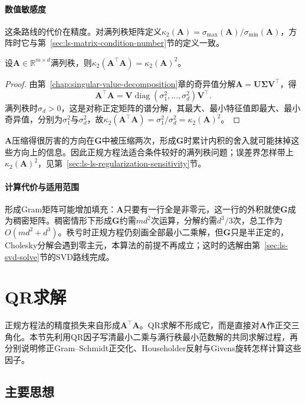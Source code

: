 \paragraph{数值敏感度}
这条路线的代价在精度。对满列秩矩阵定义$\kappa_2(\bm A)=\sigma_{\max}(\bm A)/\sigma_{\min}(\bm A)$，方阵时它与第~\ref{sec:ls-matrix-condition-number}节的定义一致。

\begin{theorem}[正规方程使条件数平方]
\label{thm:ls-normal-equations-condition-squaring}
设$\bm A\in\mathbb R^{m\times d}$满列秩，则$\kappa_2(\bm A^\top\bm A)=\kappa_2(\bm A)^2$。
\end{theorem}
\begin{proof}
由第~\ref{chap:singular-value-decomposition}章的奇异值分解$\bm A=\bm U\bm\Sigma\bm V^\top$，得
\[
 \bm A^\top\bm A=\bm V\operatorname{diag}(\sigma_1^2,\ldots,\sigma_d^2)\bm V^\top .
\]
满列秩时$\sigma_d>0$，这是对称正定矩阵的谱分解，其最大、最小特征值即最大、最小奇异值，分别为$\sigma_1^2$与$\sigma_d^2$，故$\kappa_2(\bm A^\top\bm A)=\sigma_1^2/\sigma_d^2=\kappa_2(\bm A)^2$。
\end{proof}

$\bm A$压缩得很厉害的方向在$\bm G$中被压缩两次，形成$\bm G$时累计内积的舍入就可能抹掉这些方向上的信息。因此正规方程法适合条件较好的满列秩问题；误差界怎样带上$\kappa_2(\bm A)^2$，见第~\ref{sec:ls-ls-regularization-sensitivity}节。

\paragraph{计算代价与适用范围}
形成Gram矩阵可能增加填充：$\bm A$只要有一行全是非零元，这一行的外积就使$\bm G$成为稠密矩阵。稠密情形下形成$\bm G$约需$md^2$次运算，分解约需$d^3/3$次，总工作为$O(md^2+d^3)$。秩亏时正规方程仍刻画全部最小二乘解，但$\bm G$只是半正定的，Cholesky分解会遇到零主元，本算法的前提不再成立；这时的选解由第~\ref{sec:ls-svd-solve}节的SVD路线完成。

\section{QR求解}
\label{sec:ls-qr-method}

正规方程法的精度损失来自形成$\bm A^\top\bm A$。QR求解不形成它，而是直接对$\bm A$作正交三角化。本节先利用QR因子写清最小二乘与满行秩最小范数解的共同求解过程，再分别说明修正Gram--Schmidt正交化、Householder反射与Givens旋转怎样计算这些因子。

\subsection{主要思想}

